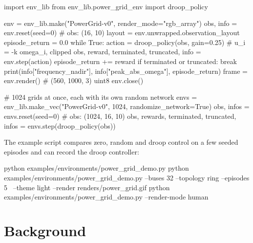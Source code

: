 \begin{pycode}
import env_lib
from env_lib.power_grid_env import droop_policy

env = env_lib.make("PowerGrid-v0", render_mode="rgb_array")
obs, info = env.reset(seed=0)              # obs: (16, 10)
layout = env.unwrapped.observation_layout
episode_return = 0.0
while True:
    action = droop_policy(obs, gain=0.25)  # u_i = -k omega_i, clipped
    obs, reward, terminated, truncated, info = env.step(action)
    episode_return += reward
    if terminated or truncated:
        break
print(info["frequency_nadir"], info["peak_abs_omega"], episode_return)
frame = env.render()                       # (560, 1000, 3) uint8
env.close()

# 1024 grids at once, each with its own random network
envs = env_lib.make_vec("PowerGrid-v0", 1024, randomize_network=True)
obs, infos = envs.reset(seed=0)            # obs: (1024, 16, 10)
obs, rewards, terminated, truncated, infos = envs.step(droop_policy(obs))
\end{pycode}

The example script compares zero, random and droop control on a few seeded
episodes and can record the droop controller:

\begin{shellcode}
python examples/environments/power_grid_demo.py
python examples/environments/power_grid_demo.py --buses 32 --topology ring --episodes 5 \
    --theme light --render renders/power_grid.gif
python examples/environments/power_grid_demo.py --render-mode human
\end{shellcode}

\section{Background}\label{sec:power-grid-background}

